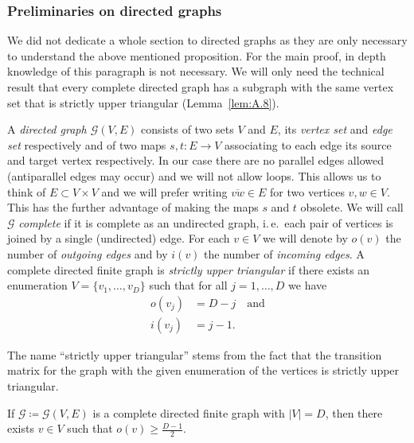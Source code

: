\subsubsection*{Preliminaries on directed graphs}
We did not dedicate a whole section to directed graphs as they are only necessary to understand the above mentioned proposition. For the main proof, in depth knowledge of this paragraph is not necessary. We will only need the technical result that every complete directed graph has a subgraph with the same vertex set that is strictly upper triangular (Lemma~\ref{lem:A.8}).

\begin{defin}
  A \emph{directed graph \(\mathcal{G}(V,E)\)} consists of two sets \(V\) and \(E\), its \emph{vertex set} and \emph{edge set} respectively and of two maps \(s, t \colon E \to V\) associating to each edge its source and target vertex respectively. In our case there are no parallel edges allowed (antiparallel edges may occur) and we will not allow loops. This allows us to think of \(E \subset V \times V\) and we will prefer writing \(\overline{vw} \in E\) for two vertices \(v,w \in V\). This has the further advantage of making the maps \(s\) and \(t\) obsolete. We will call \(\mathcal{G}\) \emph{complete} if it is complete as an undirected graph, i.\,e.\ each pair of vertices is joined by a single (undirected) edge. For each \(v \in V\) we will denote by \(o(v)\) the number of \emph{outgoing edges} and by \(i(v)\) the number of \emph{incoming edges}. A complete directed finite graph is \emph{strictly upper triangular} if there exists an enumeration \(V = \{v_1, \dots, v_D\}\) such that for all \(j = 1, \dots, D\) we have
  \begin{align*}
    o(v_j) & = D - j\quad \text{and}\\
    i(v_j) & = j - 1.
  \end{align*}
\end{defin}

\begin{rem}
  The name \enquote{strictly upper triangular} stems from the fact that the transition matrix for the graph with the given enumeration of the vertices is strictly upper triangular.
\end{rem}

\begin{lemma}[{\cite[Lemma~A.6]{MR3509968}}]
  \label{lem:A.6}
  If \(\mathcal{G} \coloneqq \mathcal{G}(V,E)\) is a complete directed finite graph with \(|V| = D\), then there exists \(v \in V\) such that \(o(v) \geq \frac{D-1}{2}\).
\end{lemma}

